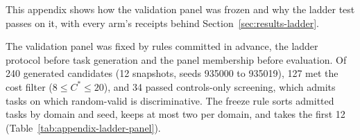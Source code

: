 This appendix shows how the validation panel was frozen and why the ladder test passes on it, with every arm's receipts behind Section~\ref{sec:results-ladder}.

The validation panel was fixed by rules committed in advance, the ladder protocol before task generation and the panel membership before evaluation. Of 240 generated candidates (12 snapshots, seeds 935000 to 935019), 127 met the cost filter ($8 \le C^* \le 20$), and 34 passed controls-only screening, which admits tasks on which random-valid is discriminative. The freeze rule sorts admitted tasks by domain and seed, keeps at most two per domain, and takes the first 12 (Table~\ref{tab:appendix-ladder-panel}).

